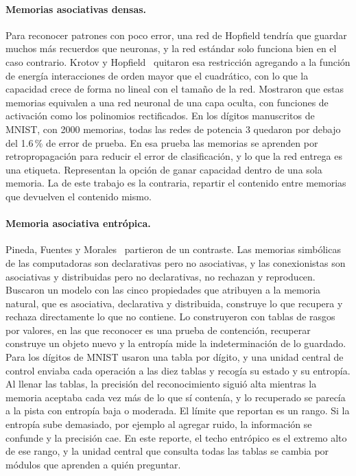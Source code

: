 \paragraph{Memorias asociativas densas.}
Para reconocer patrones con poco error, una red de Hopfield tendría que guardar muchos más
recuerdos que neuronas, y la red estándar solo funciona bien en el caso contrario.
Krotov y Hopfield~\cite{krotov2016dense} quitaron esa restricción agregando a la función
de energía interacciones de orden mayor que el cuadrático, con lo que la capacidad crece
de forma no lineal con el tamaño de la red.
Mostraron que estas memorias equivalen a una red neuronal de una capa oculta, con
funciones de activación como los polinomios rectificados.
En los dígitos manuscritos de MNIST, con 2000 memorias, todas las redes de potencia 3
quedaron por debajo del 1.6\,\% de error de prueba.
En esa prueba las memorias se aprenden por retropropagación para reducir el error de
clasificación, y lo que la red entrega es una etiqueta.
Representan la opción de ganar capacidad dentro de una sola memoria.
La de este trabajo es la contraria, repartir el contenido entre memorias que devuelven el
contenido mismo.

\paragraph{Memoria asociativa entrópica.}
Pineda, Fuentes y Morales~\cite{pineda2021entropic} partieron de un contraste.
Las memorias simbólicas de las computadoras son declarativas pero no asociativas, y las
conexionistas son asociativas y distribuidas pero no declarativas, no rechazan y
reproducen.
Buscaron un modelo con las cinco propiedades que atribuyen a la memoria natural, que es
asociativa, declarativa y distribuida, construye lo que recupera y rechaza directamente lo
que no contiene.
Lo construyeron con tablas de rasgos por valores, en las que reconocer es una prueba de
contención, recuperar construye un objeto nuevo y la entropía mide la indeterminación de
lo guardado.
Para los dígitos de MNIST usaron una tabla por dígito, y una unidad central de control
enviaba cada operación a las diez tablas y recogía su estado y su entropía.
Al llenar las tablas, la precisión del reconocimiento siguió alta mientras la memoria
aceptaba cada vez más de lo que sí contenía, y lo recuperado se parecía a la pista con
entropía baja o moderada.
El límite que reportan es un rango.
Si la entropía sube demasiado, por ejemplo al agregar ruido, la información se confunde y
la precisión cae.
En este reporte, el techo entrópico es el extremo alto de ese rango, y la unidad central
que consulta todas las tablas se cambia por módulos que aprenden a quién preguntar.

